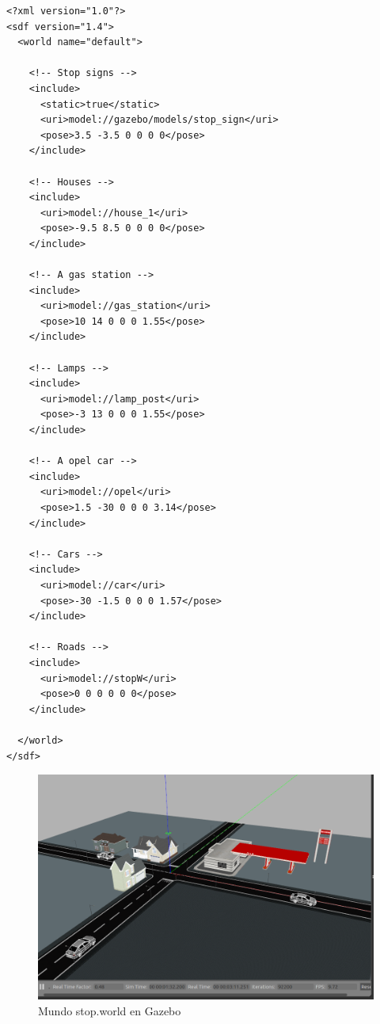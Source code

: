 \vspace{20pt}
	\begin{lstlisting}[frame=single]
<?xml version="1.0"?>
<sdf version="1.4">
  <world name="default">

    <!-- Stop signs -->
    <include>
      <static>true</static>
      <uri>model://gazebo/models/stop_sign</uri>
      <pose>3.5 -3.5 0 0 0 0</pose>
    </include>
     
    <!-- Houses -->
    <include>
      <uri>model://house_1</uri>
      <pose>-9.5 8.5 0 0 0 0</pose>
    </include>
    
    <!-- A gas station -->
    <include>
      <uri>model://gas_station</uri>
      <pose>10 14 0 0 0 1.55</pose>
    </include>   
    
    <!-- Lamps -->
    <include>
      <uri>model://lamp_post</uri>
      <pose>-3 13 0 0 0 1.55</pose>
    </include>   

    <!-- A opel car -->
    <include>
      <uri>model://opel</uri>
      <pose>1.5 -30 0 0 0 3.14</pose> 
    </include>

    <!-- Cars -->
    <include>
      <uri>model://car</uri>
      <pose>-30 -1.5 0 0 0 1.57</pose>
    </include>
    
    <!-- Roads -->
    <include>
      <uri>model://stopW</uri>
      <pose>0 0 0 0 0 0</pose>
    </include>
    
  </world>
</sdf>
	\end{lstlisting}


\begin{figure}[H]
  \begin{center}
    \includegraphics[width=1.0\textwidth]{figures/Stop/stopWorld.png}
		\caption{Mundo stop.world en Gazebo}
		\label{fig.stopWorld}
		\end{center}
\end{figure}


